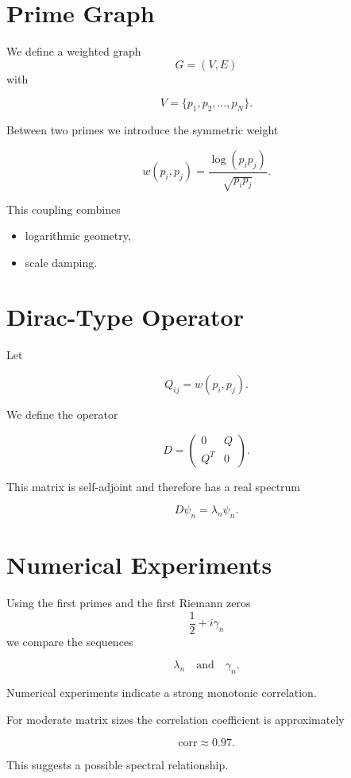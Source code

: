 \documentclass[11pt]{article}
\begin{document}
	\section{Prime Graph}
	
	We define a weighted graph
	\[
	G=(V,E)
	\]
	with
	
	\[
	V=\{p_1,p_2,\dots,p_N\}.
	\]
	
	Between two primes we introduce the symmetric weight
	
	\[
	w(p_i,p_j)
	=
	\frac{\log(p_i p_j)}{\sqrt{p_i p_j}}.
	\]
	
	This coupling combines
	
	\begin{itemize}
		\item logarithmic geometry,
		\item scale damping.
	\end{itemize}
	
	\section{Dirac-Type Operator}
	
	Let
	
	\[
	Q_{ij}=w(p_i,p_j).
	\]
	
	We define the operator
	
	\[
	D=
	\begin{pmatrix}
		0 & Q\\
		Q^T & 0
	\end{pmatrix}.
	\]
	
	This matrix is self-adjoint and therefore has a real spectrum
	
	\[
	D\psi_n=\lambda_n\psi_n .
	\]
	
	\section{Numerical Experiments}
	
	Using the first primes and the first Riemann zeros
	\[
	\frac12+i\gamma_n
	\]
	we compare the sequences
	
	\[
	\lambda_n
	\quad \text{and} \quad
	\gamma_n .
	\]
	
	Numerical experiments indicate a strong monotonic correlation.
	
	For moderate matrix sizes the correlation coefficient
	is approximately
	
	\[
	\mathrm{corr} \approx 0.97 .
	\]
	
	This suggests a possible spectral relationship.
	
\end{document}
